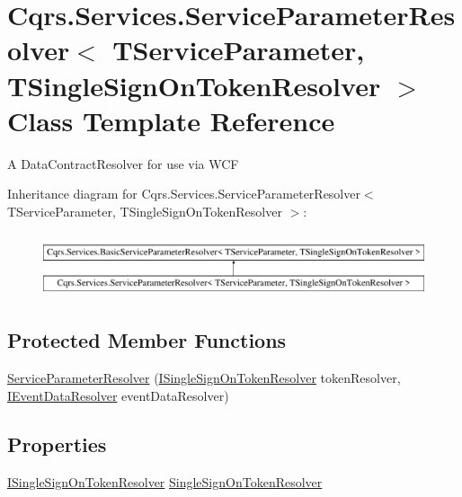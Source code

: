 \hypertarget{classCqrs_1_1Services_1_1ServiceParameterResolver}{}\section{Cqrs.\+Services.\+Service\+Parameter\+Resolver$<$ T\+Service\+Parameter, T\+Single\+Sign\+On\+Token\+Resolver $>$ Class Template Reference}
\label{classCqrs_1_1Services_1_1ServiceParameterResolver}


A Data\+Contract\+Resolver for use via W\+CF  


Inheritance diagram for Cqrs.\+Services.\+Service\+Parameter\+Resolver$<$ T\+Service\+Parameter, T\+Single\+Sign\+On\+Token\+Resolver $>$\+:\begin{figure}[H]
\begin{center}
\leavevmode
\includegraphics[height=1.876047cm]{classCqrs_1_1Services_1_1ServiceParameterResolver}
\end{center}
\end{figure}
\subsection*{Protected Member Functions}
\begin{DoxyCompactItemize}
\item 
\hyperlink{classCqrs_1_1Services_1_1ServiceParameterResolver_ad7afabf942df245316a2b27d31ee30bd_ad7afabf942df245316a2b27d31ee30bd}{Service\+Parameter\+Resolver} (\hyperlink{interfaceCqrs_1_1Services_1_1ISingleSignOnTokenResolver}{I\+Single\+Sign\+On\+Token\+Resolver} token\+Resolver, \hyperlink{interfaceCqrs_1_1Services_1_1IEventDataResolver}{I\+Event\+Data\+Resolver} event\+Data\+Resolver)
\end{DoxyCompactItemize}
\subsection*{Properties}
\begin{DoxyCompactItemize}
\item 
\hyperlink{interfaceCqrs_1_1Services_1_1ISingleSignOnTokenResolver}{I\+Single\+Sign\+On\+Token\+Resolver} \hyperlink{classCqrs_1_1Services_1_1ServiceParameterResolver_a08650fb09869509a27501652649738f4_a08650fb09869509a27501652649738f4}{Single\+Sign\+On\+Token\+Resolver}
\end{DoxyCompactItemize}
